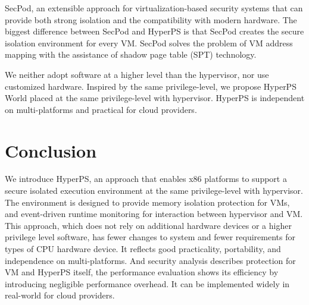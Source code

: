 \documentclass[conference]{IEEEtran}
\begin{document}
SecPod, an extensible approach for virtualization-based security systems that can provide both strong isolation and the compatibility with modern hardware. The biggest difference between SecPod and HyperPS is that SecPod creates the secure isolation environment for every VM. SecPod solves the problem of VM address mapping with the assistance of shadow page table (SPT) technology.

We neither adopt software at a higher level than the hypervisor, nor use customized hardware. Inspired by the same privilege-level, we propose HyperPS World placed at the same privilege-level with hypervisor. HyperPS is independent on multi-platforms and practical for cloud providers.

\section{Conclusion}\label{sec:conclusion}
We introduce HyperPS, an approach that enables x86 platforms to support a secure isolated execution environment at the same privilege-level with hypervisor. The environment is designed to provide memory isolation protection for VMs, and event-driven runtime monitoring for interaction between hypervisor and VM. This approach, which does not rely on additional hardware devices or a higher privilege level software, has fewer changes to system and fewer requirements for types of CPU hardware device. It reflects good practicality, portability, and independence on multi-platforms. And security analysis describes protection for VM and HyperPS itself, the performance evaluation shows its efficiency by introducing negligible performance overhead. It can be implemented widely in real-world for cloud providers.









 

\end{document}
